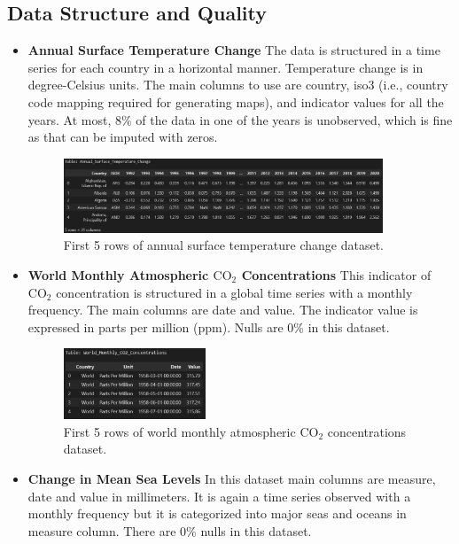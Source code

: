 \documentclass[a4paper,11pt]{article}
\begin{document}
\subsection{Data Structure and Quality}
\begin{itemize}
    \item \textbf{Annual Surface Temperature Change} The data is structured in a time series for each country in a horizontal manner. Temperature change is in degree-Celsius units. The main columns to use are country, iso3 (i.e., country code mapping required for generating maps), and indicator values for all the years. At most, 8\% of the data in one of the years is unobserved, which is fine as that can be imputed with zeros.

    \begin{figure}[ht!]
        \centering
        \includegraphics[width=0.9\textwidth]{pictures/atmos.png}
        \caption{First 5 rows of annual surface temperature change dataset.}
        \label{fig:dataset1}
    \end{figure}

    \item \textbf{World Monthly Atmospheric \(\text{CO}_2\) Concentrations} This indicator of \(\text{CO}_2\) concentration is structured in a global time series with a monthly frequency. The main columns are date and value. The indicator value is expressed in parts per million (ppm). Nulls are 0\% in this dataset.

    \begin{figure}[ht!]
        \centering
        \includegraphics[width=0.4\textwidth]{pictures/co2.png}
        \caption{First 5 rows of world monthly atmospheric \(\text{CO}_2\) concentrations dataset.}
        \label{fig:dataset2}
    \end{figure}

    \item \textbf{Change in Mean Sea Levels} In this dataset main columns are measure, date and value in millimeters. It is again a time series observed with a monthly frequency but it is categorized into major seas and oceans in measure column. There are 0\% nulls in this dataset.


\end{itemize}
\end{document}
